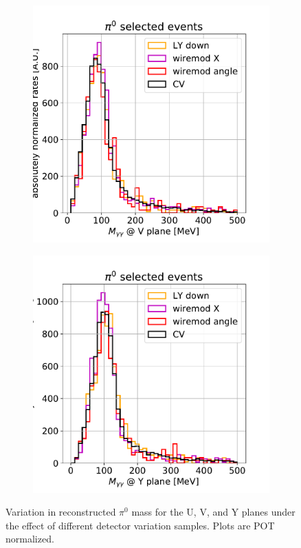 \documentclass[a4paper]{article}
\begin{document}
\begin{figure}[H]
\begin{center}
\begin{subfigure}[b]{0.3\textwidth}
    \includegraphics[width=1.00\textwidth]{detsys/pi0_mass_V01162020_bnbnumu.pdf}
    \end{subfigure}
    \begin{subfigure}[b]{0.3\textwidth}
    \centering
    \includegraphics[width=1.00\textwidth]{detsys/pi0_mass_Y01162020_bnbnumu.pdf}
    \end{subfigure}
\caption{\label{fig:detsys:dedx:eLEElow}Variation in reconstructed $\pi^0$ mass for the U, V, and Y planes under the effect of different detector variation samples. Plots are POT normalized.}
\end{center}
\end{figure}
\end{document}
